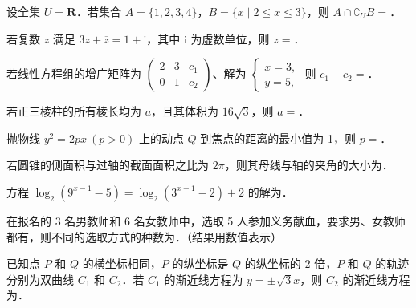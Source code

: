 \begin{question}
设全集 \(U=\mathbf{R}\)．若集合 \(A=\{1,2,3,4\}\)，\(B=\{x\mid 2\leqslant x\leqslant 3\}\)，则 \(A\cap\complement_{U}B=\)\gkblank{}．

\end{question}
\begin{question}
若复数 \(z\) 满足 \(3z+\overline{z}=1+\mathrm{i}\)，其中 \(\mathrm{i}\) 为虚数单位，则 \(z=\)\gkblank{}．

\end{question}
\begin{question}
若线性方程组的增广矩阵为 $\begin{pmatrix} 2 & 3 & c_{1}\\ 0 & 1 & c_{2} \end{pmatrix}$、解为 $\begin{cases} x=3,\\ y=5, \end{cases}$ 则 \(c_{1}-c_{2}=\)\gkblank{}．

\end{question}
\begin{question}
若正三棱柱的所有棱长均为 \(a\)，且其体积为 \(16\sqrt{3}\)，则 \(a=\)\gkblank{}．

\end{question}
\begin{question}
抛物线 \(y^{2}=2px\ (p>0)\) 上的动点 \(Q\) 到焦点的距离的最小值为 1，则 \(p=\)\gkblank{}．

\end{question}
\begin{question}
若圆锥的侧面积与过轴的截面面积之比为 \(2\pi\)，则其母线与轴的夹角的大小为\gkblank{}．

\end{question}
\begin{question}
方程 \(\log_{2}(9^{x-1}-5)=\log_{2}(3^{x-1}-2)+2\) 的解为\gkblank{}．

\end{question}
\begin{question}
在报名的 3 名男教师和 6 名女教师中，选取 5 人参加义务献血，要求男、女教师都有，则不同的选取方式的种数为\gkblank{}．（结果用数值表示）

\end{question}
\begin{question}
已知点 \(P\) 和 \(Q\) 的横坐标相同，\(P\) 的纵坐标是 \(Q\) 的纵坐标的 2 倍，\(P\) 和 \(Q\) 的轨迹分别为双曲线 \(C_{1}\) 和 \(C_{2}\)．若 \(C_{1}\) 的渐近线方程为 \(y=\pm\sqrt{3}x\)，则 \(C_{2}\) 的渐近线方程为\gkblank{}．

\end{question}
